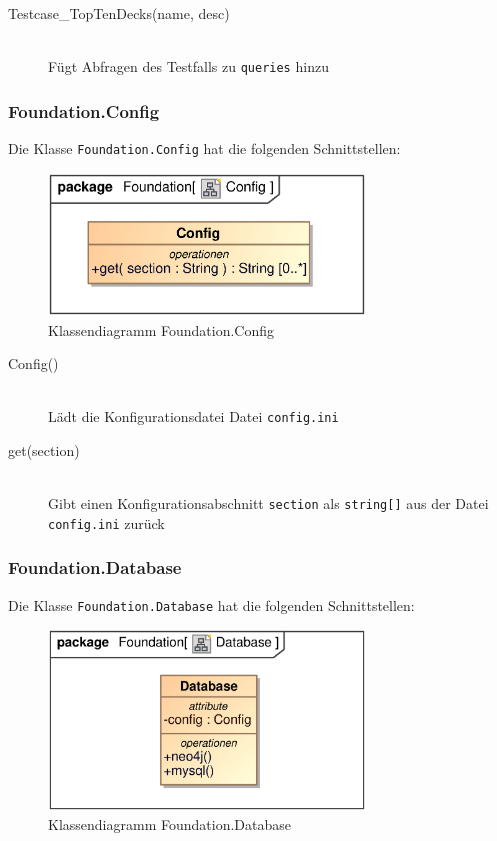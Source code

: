 \begin{description}
    \item[Testcase\_TopTenDecks(name, desc)] \hfill \\
    Fügt Abfragen des Testfalls zu \verb|queries| hinzu
\end{description}

\subsubsection{Foundation.Config}
Die Klasse \verb|Foundation.Config| hat die folgenden Schnittstellen:

\begin{figure}[H]
    \myfloatalign
    \includegraphics[width=0.75\textwidth]{gfx/MtGDeepAnalysis/Config.eps}
    \caption{Klassendiagramm Foundation.Config}
    \label{fig:class:foundation.config}
\end{figure}

\begin{description}
    \item[Config()] \hfill \\
    Lädt die Konfigurationsdatei Datei \verb|config.ini|
    
    \item[get(section)] \hfill \\
    Gibt einen Konfigurationsabschnitt \verb|section| als \verb|string[]| aus der Datei \verb|config.ini| zurück
\end{description}


\subsubsection{Foundation.Database}
Die Klasse \verb|Foundation.Database| hat die folgenden Schnittstellen:

\begin{figure}[H]
    \myfloatalign
    \includegraphics[width=0.75\textwidth]{gfx/MtGDeepAnalysis/Database.eps}
    \caption{Klassendiagramm Foundation.Database}
    \label{fig:class:foundation.database}
\end{figure}

